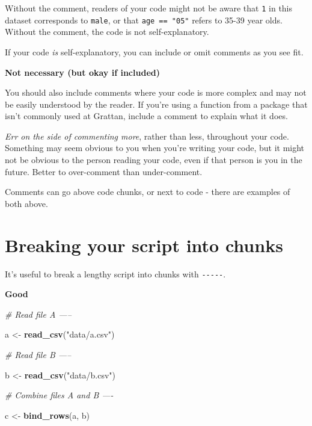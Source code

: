 \documentclass[]{book}
\newenvironment{Shaded}{\begin{snugshade}}{\end{snugshade}}
\newcommand{\CommentTok}[1]{\textcolor[rgb]{0.56,0.35,0.01}{\textit{#1}}}
\newcommand{\DecValTok}[1]{\textcolor[rgb]{0.00,0.00,0.81}{#1}}
\newcommand{\KeywordTok}[1]{\textcolor[rgb]{0.13,0.29,0.53}{\textbf{#1}}}
\newcommand{\NormalTok}[1]{#1}
\newcommand{\OperatorTok}[1]{\textcolor[rgb]{0.81,0.36,0.00}{\textbf{#1}}}
\newcommand{\StringTok}[1]{\textcolor[rgb]{0.31,0.60,0.02}{#1}}
\begin{document}
Without the comment, readers of your code might not be aware that \texttt{1} in this dataset corresponds to \texttt{male}, or that \texttt{age\ ==\ "05"} refers to 35-39 year olds. Without the comment, the code is not self-explanatory.

If your code \emph{is} self-explanatory, you can include or omit comments as you see fit.

\textbf{Not necessary (but okay if included)}

\begin{Shaded}
\end{Shaded}

You should also include comments where your code is more complex and may not be easily understood by the reader. If you're using a function from a package that isn't commonly used at Grattan, include a comment to explain what it does.

\emph{Err on the side of commenting more}, rather than less, throughout your code. Something may seem obvious to you when you're writing your code, but it might not be obvious to the person reading your code, even if that person is you in the future. Better to over-comment than under-comment.

Comments can go above code chunks, or next to code - there are examples of both above.

\hypertarget{breaking-your-script-into-chunks}{%
\section{Breaking your script into chunks}\label{breaking-your-script-into-chunks}}

It's useful to break a lengthy script into chunks with \texttt{-\/-\/-\/-\/-}.

\textbf{Good}

\begin{Shaded}
\begin{Highlighting}[]
\CommentTok{# Read file A -----}

\NormalTok{a <-}\StringTok{ }\KeywordTok{read_csv}\NormalTok{(}\StringTok{"data/a.csv"}\NormalTok{)}

\CommentTok{# Read file B -----}

\NormalTok{b <-}\StringTok{ }\KeywordTok{read_csv}\NormalTok{(}\StringTok{"data/b.csv"}\NormalTok{)}

\CommentTok{# Combine files A and B ----}

\NormalTok{c <-}\StringTok{ }\KeywordTok{bind_rows}\NormalTok{(a, b)}
\end{Highlighting}
\end{Shaded}
\end{document}
